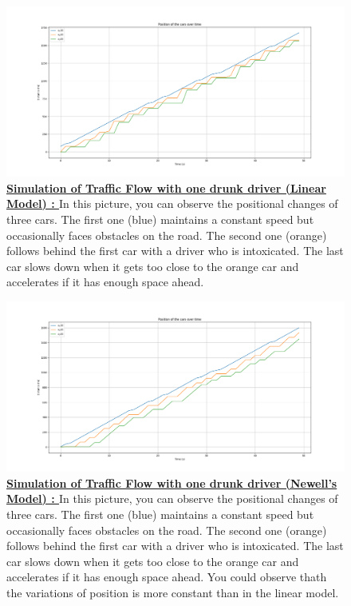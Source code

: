 \documentclass{article}
\begin{document}
		\begin{figure}[H]
			\centering
			\includegraphics[width=\textwidth]{Model1W3C_O_Aco_D2_Linear.png}
			\caption[Simulation of Traffic Flow with one drunk driver (Linear Model).]{\textbf{\underline{Simulation of Traffic Flow with one drunk driver (Linear Model) : }} In this picture, you can observe the positional changes of three cars. The first one (blue) maintains a constant speed but occasionally faces obstacles on the road. The second one (orange) follows behind the first car with a driver who is intoxicated. The last car slows down when it gets too close to the orange car and accelerates if it has enough space ahead.}
			\label{fig:Model1W3C_O_Aco_D2_Linear}
		\end{figure}
		
		\begin{figure}[H]
		\centering
		\includegraphics[width=\textwidth]{Model1W3C_O_Aco_D2_Newell.png}
		\caption[Simulation of Traffic Flow with one drunk driver (Newell's Model).]{\textbf{\underline{Simulation of Traffic Flow with one drunk driver (Newell's Model) : }} In this picture, you can observe the positional changes of three cars. The first one (blue) maintains a constant speed but occasionally faces obstacles on the road. The second one (orange) follows behind the first car with a driver who is intoxicated. The last car slows down when it gets too close to the orange car and accelerates if it has enough space ahead. You could observe thath the variations of position is more constant than in the linear model.}
		\label{fig:Model1W3C_O_Aco_D2_Newell}
	\end{figure}
		
\end{document}
